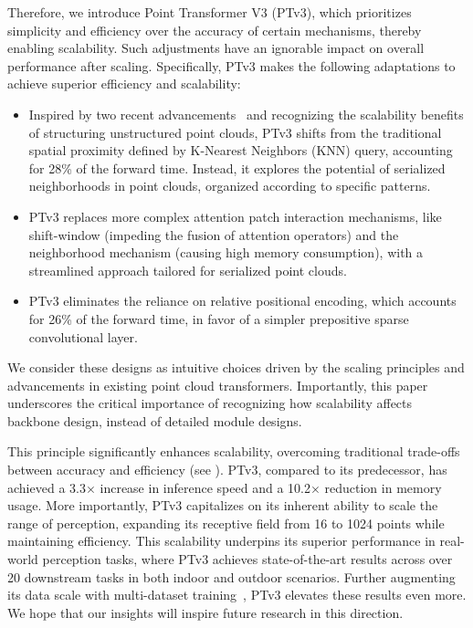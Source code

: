 Therefore, we introduce Point Transformer V3 (PTv3), which prioritizes simplicity and efficiency over the accuracy of certain mechanisms, thereby enabling scalability. Such adjustments have an ignorable impact on overall performance after scaling. Specifically, PTv3 makes the following adaptations to achieve superior efficiency and scalability:
\begin{itemize}[leftmargin=4mm, itemsep=0mm, topsep=0mm, partopsep=0mm]
    \item Inspired by two recent advancements~\cite{Wang2023OctFormer, liu2023flatformer} and recognizing the scalability benefits of structuring unstructured point clouds, PTv3 shifts from the traditional spatial proximity defined by K-Nearest Neighbors (KNN) query, accounting for 28\% of the forward time. Instead, it explores the potential of serialized neighborhoods in point clouds, organized according to specific patterns.
    \item PTv3 replaces more complex attention patch interaction mechanisms, like shift-window (impeding the fusion of attention operators) and the neighborhood mechanism (causing high memory consumption), with a streamlined approach tailored for serialized point clouds.
    \item PTv3 eliminates the reliance on relative positional encoding, which accounts for 26\% of the forward time, in favor of a simpler prepositive sparse convolutional layer.
\end{itemize}
We consider these designs as intuitive choices driven by the scaling principles and advancements in existing point cloud transformers. Importantly, this paper underscores the critical importance of recognizing how scalability affects backbone design, instead of detailed module designs.

This principle significantly enhances scalability, overcoming traditional trade-offs between accuracy and efficiency (see ). PTv3, compared to its predecessor, has achieved a 3.3$\times$ increase in inference speed and a 10.2$\times$ reduction in memory usage. More importantly, PTv3 capitalizes on its inherent ability to scale the range of perception, expanding its receptive field from 16 to 1024 points while maintaining efficiency. This scalability underpins its superior performance in real-world perception tasks, where PTv3 achieves state-of-the-art results across over 20 downstream tasks in both indoor and outdoor scenarios. Further augmenting its data scale with multi-dataset training~\cite{wu2023ppt}, PTv3 elevates these results even more. We hope that our insights will inspire future research in this direction.
